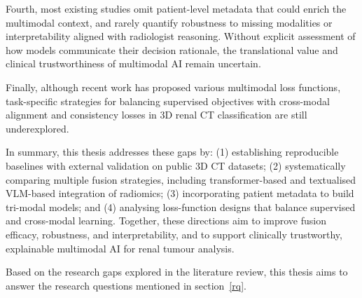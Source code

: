 \documentclass[final,british,a4paper,12pt]{phdthesis}
\begin{document}
Fourth, most existing studies omit patient-level metadata that could enrich the multimodal context, and rarely quantify robustness to missing modalities or interpretability aligned with radiologist reasoning. Without explicit assessment of how models communicate their decision rationale, the translational value and clinical trustworthiness of multimodal AI remain uncertain.

Finally, although recent work has proposed various multimodal loss functions, task-specific strategies for balancing supervised objectives with cross-modal alignment and consistency losses in 3D renal CT classification are still underexplored.

In summary, this thesis addresses these gaps by: (1) establishing reproducible baselines with external validation on public 3D CT datasets; (2) systematically comparing multiple fusion strategies, including transformer-based and textualised VLM-based integration of radiomics; (3) incorporating patient metadata to build tri-modal models; and (4) analysing loss-function designs that balance supervised and cross-modal learning. Together, these directions aim to improve fusion efficacy, robustness, and interpretability, and to support clinically trustworthy, explainable multimodal AI for renal tumour analysis.

Based on the research gaps explored in the literature review, this thesis aims to answer the  research questions mentioned in section~\ref{rq}.
        
        



\end{document}
